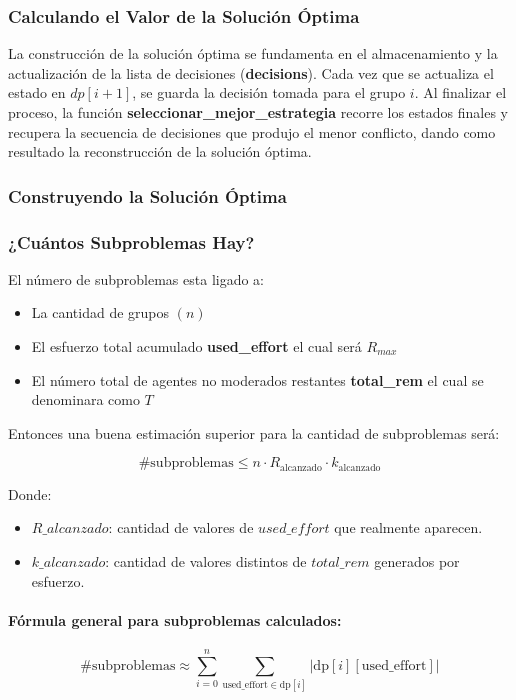 \documentclass[11pt,letter]{article}
\begin{document}
\begin{itemize}
    \subsubsection{Calculando el Valor de la Solución Óptima}
    La construcción de la solución óptima se fundamenta en el almacenamiento y la actualización de la lista de decisiones (\textbf{decisions}). Cada vez que se actualiza el estado en $dp[i+1]$, se guarda la decisión tomada para el grupo $i$. Al finalizar el proceso, la función \textbf{seleccionar\_mejor\_estrategia} recorre los estados finales y recupera la secuencia de decisiones que produjo el menor conflicto, dando como resultado la reconstrucción de la solución óptima.
    \subsubsection{Construyendo la Solución Óptima}
    \subsubsection{¿Cuántos Subproblemas Hay?}
    El número de subproblemas esta ligado a:
    \begin{itemize}
    \item La cantidad de grupos $(n)$
    \item El esfuerzo total acumulado \textbf{used\_effort} el cual será $R_{max}$
    \item El número total de agentes no moderados restantes \textbf{total\_rem} el cual se denominara como $T$
\end{itemize}

Entonces una buena estimación superior para la cantidad de subproblemas será:

\[
\text{#subproblemas} \leq n \cdot R_{\text{alcanzado}} \cdot k_{\text{alcanzado}}
\]

Donde:
\begin{itemize}
    \item $R\_alcanzado$: cantidad de valores de $used\_effort$ que realmente aparecen.
    \item $k\_alcanzado$: cantidad de valores distintos de $total\_rem$ generados por esfuerzo.
\end{itemize}

\paragraph{Fórmula general para subproblemas calculados:}
\[
\# \text{subproblemas} \approx \sum_{i=0}^{n} \sum_{\text{used\_effort} \in \text{dp}[i]} \left| \text{dp}[i][\text{used\_effort}] \right|
\]


\end{itemize}
\end{document}
